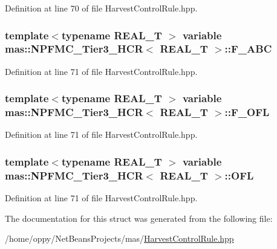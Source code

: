 Definition at line 70 of file Harvest\-Control\-Rule.\-hpp.

\hypertarget{structmas_1_1_n_p_f_m_c___tier3___h_c_r_ae91373c1b4216cd93126615e881b9d92}{
\subsubsection[{F\-\_\-\-A\-B\-C}]{\setlength{\rightskip}{0pt plus 5cm}template$<$typename R\-E\-A\-L\-\_\-\-T $>$ {\bf variable} {\bf mas\-::\-N\-P\-F\-M\-C\-\_\-\-Tier3\-\_\-\-H\-C\-R}$<$ R\-E\-A\-L\-\_\-\-T $>$\-::F\-\_\-\-A\-B\-C}}\label{structmas_1_1_n_p_f_m_c___tier3___h_c_r_ae91373c1b4216cd93126615e881b9d92}


Definition at line 71 of file Harvest\-Control\-Rule.\-hpp.

\hypertarget{structmas_1_1_n_p_f_m_c___tier3___h_c_r_a5dd5ec6b7ffd1eae4a0b32cf062cf51f}{
\subsubsection[{F\-\_\-\-O\-F\-L}]{\setlength{\rightskip}{0pt plus 5cm}template$<$typename R\-E\-A\-L\-\_\-\-T $>$ {\bf variable} {\bf mas\-::\-N\-P\-F\-M\-C\-\_\-\-Tier3\-\_\-\-H\-C\-R}$<$ R\-E\-A\-L\-\_\-\-T $>$\-::F\-\_\-\-O\-F\-L}}\label{structmas_1_1_n_p_f_m_c___tier3___h_c_r_a5dd5ec6b7ffd1eae4a0b32cf062cf51f}


Definition at line 71 of file Harvest\-Control\-Rule.\-hpp.

\hypertarget{structmas_1_1_n_p_f_m_c___tier3___h_c_r_aea706f530b4d4d6ec4df8a5aead87890}{
\subsubsection[{O\-F\-L}]{\setlength{\rightskip}{0pt plus 5cm}template$<$typename R\-E\-A\-L\-\_\-\-T $>$ {\bf variable} {\bf mas\-::\-N\-P\-F\-M\-C\-\_\-\-Tier3\-\_\-\-H\-C\-R}$<$ R\-E\-A\-L\-\_\-\-T $>$\-::O\-F\-L}}\label{structmas_1_1_n_p_f_m_c___tier3___h_c_r_aea706f530b4d4d6ec4df8a5aead87890}


Definition at line 71 of file Harvest\-Control\-Rule.\-hpp.



The documentation for this struct was generated from the following file\-:\begin{DoxyCompactItemize}
\item 
/home/oppy/\-Net\-Beans\-Projects/mas/\hyperlink{_harvest_control_rule_8hpp}{Harvest\-Control\-Rule.\-hpp}\end{DoxyCompactItemize}
